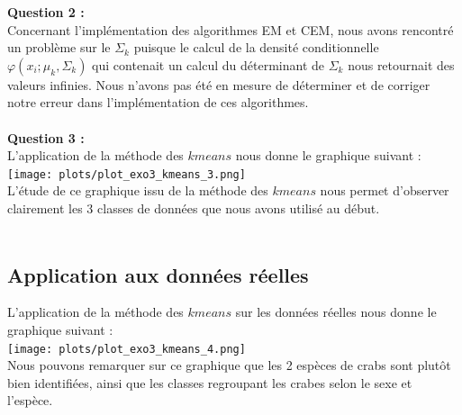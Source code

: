 \documentclass[a4paper, 10pt]{article}
\begin{document}
\textbf{Question 2 :}\\
Concernant l'implémentation des algorithmes EM et CEM, nous avons rencontré un problème sur le $\Sigma_{k}$ puisque
le calcul de la densité conditionnelle
$\varphi(x_{i}; \mu_{k}, \Sigma_{k})$ qui contenait un calcul du déterminant de $\Sigma_{k}$ nous retournait des valeurs infinies.
Nous n'avons pas été en mesure de déterminer et de corriger notre erreur dans l'implémentation de ces algorithmes.\\ \\
\textbf{Question 3 :}\\
L'application de la méthode des $kmeans$ nous donne le graphique suivant :\\
\texttt{[image: plots/plot\_exo3\_kmeans\_3.png]}\\
L'étude de ce graphique issu de la méthode des $kmeans$ nous permet d'observer clairement les 3 classes de données que nous avons utilisé au
début.\\ \\

\subsection*{Application aux données réelles}
L'application de la méthode des $kmeans$ sur les données réelles nous donne le graphique suivant :\\
\texttt{[image: plots/plot\_exo3\_kmeans\_4.png]}\\
Nous pouvons remarquer sur ce graphique que les 2 espèces de crabs sont plutôt bien identifiées,
ainsi que les classes regroupant les crabes selon le sexe et l'espèce.\\ \\

  
\end{document}
